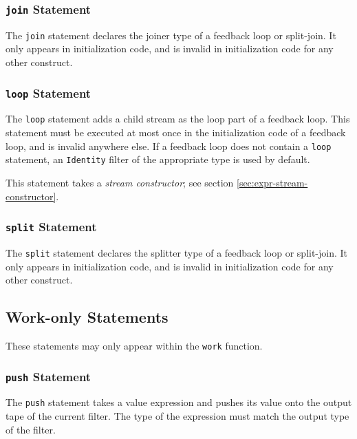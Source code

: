 \documentclass[11pt]{article}
\begin{document}
\subsubsection{\lstinline|join| Statement}

The \lstinline|join| statement declares the joiner type of a feedback
loop or split-join.  It only appears in initialization code, and is
invalid in initialization code for any other construct.  

\subsubsection{\lstinline|loop| Statement}

The \lstinline|loop| statement adds a child stream as the loop part of
a feedback loop.  This statement must be executed at most once in the
initialization code of a feedback loop, and is invalid anywhere else.
If a feedback loop does not contain a \lstinline|loop| statement, an
\lstinline|Identity| filter of the appropriate type is used by
default.

This statement takes a \emph{stream constructor}; see section
\ref{sec:expr-stream-constructor}.

\subsubsection{\lstinline|split| Statement}

The \lstinline|split| statement declares the splitter type of a feedback
loop or split-join.  It only appears in initialization code, and is
invalid in initialization code for any other construct.  

\subsection{Work-only Statements}

These statements may only appear within the \lstinline|work| function.

\subsubsection{\lstinline|push| Statement}

The \lstinline|push| statement takes a value expression and pushes its
value onto the output tape of the current filter.  The type of the
expression must match the output type of the filter.
\end{document}
